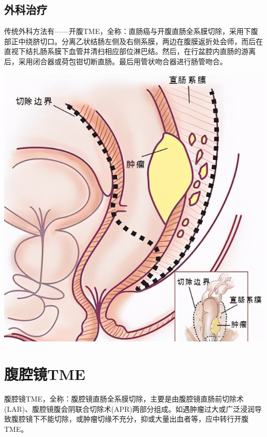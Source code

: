 \documentclass[a4paper,11pt,onecolumn,twoside]{article}
\begin{document}
\begin{multicols}{2}
    \subsection{外科治疗}
    传统外科方法有——开腹TME，全称：直肠癌与开腹直肠全系膜切除，采用下腹部正中绕脐切口。分离乙状结肠左侧及右侧系膜，两边在腹膜返折处会师，而后在直视下结扎肠系膜下血管并清扫相应部位淋巴结。然后，在行盆腔内直肠的游离后，采用闭合器或荷包钳切断直肠。最后用管状吻合器进行肠管吻合\supercite{1}。

    \begin{figurehere}
        \begin{center}
            \includegraphics[width=\linewidth]{img/r.jpg}
            \label{DNN}
        \end{center}
    \end{figurehere}

    \section{腹腔镜TME}
    腹腔镜TME，全称：腹腔镜直肠全系膜切除，主要是由腹腔镜直肠前切除术(LAR)、腹腔镜腹会阴联合切除术(APR)\supercite{2}两部分组成。如遇肿瘤过大或广泛浸润导致腹腔镜下不能切除，或肿瘤切缘不充分，抑或大量出血者等，应中转行开腹TME。

\end{multicols}
\end{document}
